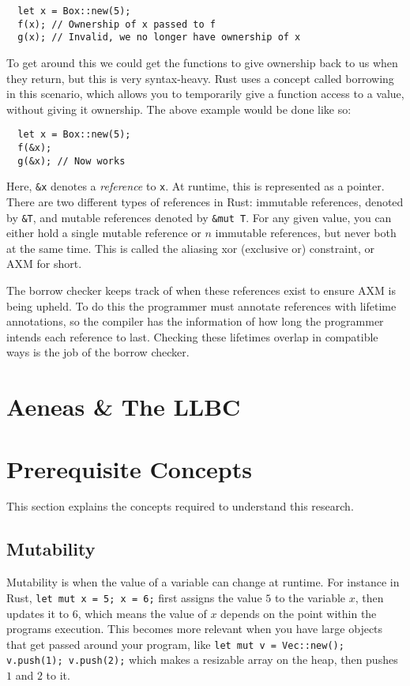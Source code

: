 \documentclass[12pt,twoside]{report}
\begin{document}
\begin{lstlisting}
  let x = Box::new(5);
  f(x); // Ownership of x passed to f
  g(x); // Invalid, we no longer have ownership of x
\end{lstlisting}

To get around this we could get the functions to give ownership back to us when they return, but this is very syntax-heavy. Rust uses a concept called borrowing in this scenario, which allows you to temporarily give a function access to a value, without giving it ownership. The above example would be done like so:

\begin{lstlisting}
  let x = Box::new(5);
  f(&x);
  g(&x); // Now works
\end{lstlisting}

Here, \verb|&x| denotes a \textit{reference} to \verb|x|. At runtime, this is represented as a pointer. There are two different types of references in Rust: immutable references, denoted by \verb|&T|, and mutable references denoted by \verb|&mut T|. For any given value, you can either hold a single mutable reference or $n$ immutable references, but never both at the same time. This is called the aliasing xor (exclusive or) constraint, or AXM for short.

The borrow checker keeps track of when these references exist to ensure AXM is being upheld. To do this the programmer must annotate references with lifetime annotations, so the compiler has the information of how long the programmer intends each reference to last. Checking these lifetimes overlap in compatible ways is the job of the borrow checker.


\section{Aeneas \& The LLBC}

\section{Prerequisite Concepts}
\label{prerequisites}
This section explains the concepts required to understand this research.

\subsection{Mutability}
Mutability is when the value of a variable can change at runtime. For instance in Rust, \verb|let mut x = 5; x = 6;| first assigns the value $5$ to the variable $x$, then updates it to $6$, which means the value of $x$ depends on the point within the programs execution. This becomes more relevant when you have large objects that get passed around your program, like \verb|let mut v = Vec::new(); v.push(1); v.push(2);| which makes a resizable array on the heap, then pushes $1$ and $2$ to it.
\end{document}
